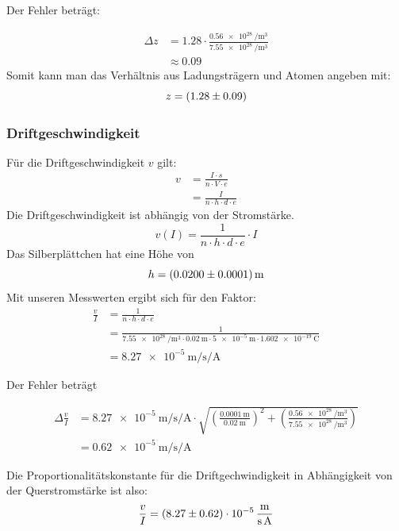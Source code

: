 Der Fehler beträgt:

\begin{align*}
\Delta z &= 1.28 \cdot \frac{\SI{0.56e28}{\per\cubic\meter}}{\SI{7.55e28}{\per\cubic\meter}}\\
&\approx 0.09
\end{align*}
Somit kann man das Verhältnis aus Ladungsträgern und Atomen angeben mit:
$$z = \SI{1.28 \pm 0.09}{}$$

\subsubsection{Driftgeschwindigkeit}
Für die Driftgeschwindigkeit $v$ gilt:
\begin{align*}
v &= \frac{I \cdot s}{n \cdot V \cdot e} \\
  &= \frac{I}{n \cdot h \cdot d \cdot e}
\end{align*}
Die Driftgeschwindigkeit ist abhängig von der Stromstärke.
$$v(I) = \frac{1}{n \cdot h \cdot d \cdot e} \cdot I$$
Das Silberplättchen hat eine Höhe von
$$h = \SI{0.02 \pm 0.0001}{\meter}$$
Mit unseren Messwerten ergibt sich für den Faktor:
\begin{align*}
\frac{v}{I} &= \frac{1}{n \cdot h \cdot d \cdot e} \\
    &= \frac{1}{\SI{7.55e28}{\per\cubic\meter} \cdot \SI{0.02}{\meter} \cdot \SI{5e-5}{\meter} \cdot \SI{1.602e-19}{\coulomb}} \\
    &= \SI{8.27e-5}{\meter\per\second\per\ampere}
\end{align*}

Der Fehler beträgt

\begin{align*}
\Delta \frac{v}{I} &= \SI{8.27e-5}{\meter\per\second\per\ampere} \cdot \sqrt{\left(\frac{\SI{0.0001}{\meter}}{\SI{0.02}{\meter}}\right)^2 + \left(\frac{\SI{0.56e28}{\per\cubic\meter}}{\SI{7.55e28}{\per\cubic\meter}}\right)} \\
&= \SI{0.62e-5}{\meter\per\second\per\ampere}
\end{align*}

Die Proportionalitätskonstante für die Driftgechwindigkeit in Abhängigkeit von der Querstromstärke ist also:
$$\frac{v}{I} = \SI{8.27 \pm 0.62e-5}{\meter\per\second\per\ampere}$$